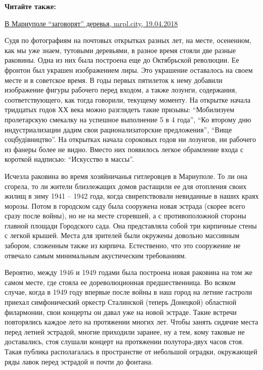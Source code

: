 \textbf{Читайте также:} 

\href{https://archive.org/details/19_04_2018.mrpl_city.v_mariupole_zagovorjat_derevja}{В Мариуполе \enquote{заговорят} деревья, mrpl.city, 19.04.2018}

Судя по фотографиям на почтовых открытках разных лет, на месте, осененном, как
мы уже знаем, тутовыми деревьями, в разное время стояли две разные раковины.
Одна из них была построена еще до Октябрьской революции. Ее фронтон был
украшен изображением лиры. Это украшение оставалось на своем месте и в
советское время. В годы первых пятилеток к нему добавили изображение фигуры
рабочего перед входом, а также лозунги, содержания, соответствующего, как
тогда говорили, текущему моменту. На открытке начала тридцатых годов ХХ века
можно разглядеть такие призывы: \enquote{Мобилизуем пролетарскую смекалку на успешное
выполнение 5 в 4 года}, \enquote{Ко второму дню индустриализации дадим свои
рационализаторские предложения}, \enquote{Вище соцбудівництво}. На открытках начала
сороковых годов ни лозунгов, ни рабочего из фанеры более не видно. Вместо них
появилось легкое обрамление входа с короткой надписью: \enquote{Искусство в массы}.

Исчезла раковина во время хозяйничанья гитлеровцев в Мариуполе. То ли она
сгорела, то ли жители близлежащих домов растащили ее для отопления своих жилищ
в зиму 1941 – 1942 года, когда свирепствовали невиданные в наших краях морозы.
Потом в городском саду была сооружена новая эстрада (скорее всего сразу после
войны), но не на месте сгоревшей, а с противоположной стороны главной площади
Городского сада. Она представляла собой три кирпичные стены с легкой крышей.
Места для зрителей были окружены довольно массивным забором, сложенным также из
кирпича. Естественно, что это сооружение не отвечало самым минимальным
акустическим требованиям.

Вероятно, между 1946 и 1949 годами была построена новая раковина на том же
самом месте, где стояла ее дореволюционная предшественница. Во всяком случае,
когда в 1949 году впервые после войны в наш город на летние гастроли приехал
симфонический оркестр Сталинской (теперь Донецкой) областной филармонии, свои
концерты он давал уже на новой эстраде. Такие встречи повторялись каждое лето
на протяжении многих лет. Чтобы занять сидячие места перед летней эстрадой,
многие приходили заранее, ну а тем, кому таковые не доставались, стоя слушали
концерт на протяжении полутора-двух часов стоя. Такая публика располагалась в
пространстве от небольшой оградки, окружающей ряды лавок перед эстрадой и почти
до фонтана.

